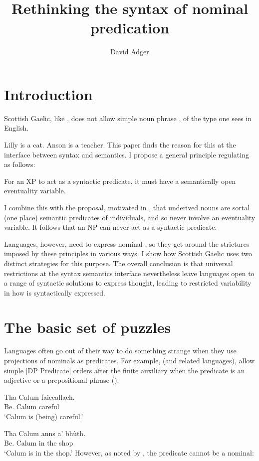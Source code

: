 \documentclass[output=paper]{langsci/langscibook}
\author{David Adger\affiliation{Queen Mary University of London}}
\title{Rethinking the syntax of nominal predication}
\begin{document}
\glsresetall

\section{Introduction}

Scottish Gaelic, like , does not allow simple noun phrase , of
the type one sees in English.

\ea
\ea Lilly is a cat.
\ex Anson is a teacher.
\z
\z
This paper finds the reason for this at the interface between syntax and
semantics. I propose a general principle regulating  as follows:

\ea For an XP to act as a syntactic predicate, it must have a semantically open
eventuality variable.
\z

I combine this with the proposal, motivated in \textcite{adgerbook}, that
underived nouns are sortal (one place) semantic predicates of individuals, and
so never involve an eventuality variable. It follows that an NP can never act
as a syntactic predicate.

Languages, however, need to express nominal , so they get around the
strictures imposed by these principles in various ways. I show how Scottish
Gaelic uses two distinct strategies for this purpose.  The overall conclusion
is that universal restrictions at the syntax semantics interface nevertheless
leave languages open to a range of syntactic solutions to express thought,
leading to restricted variability in how  is syntactically
expressed.

\section{The basic set of puzzles}

Languages often go out of their way to do something strange when they use
projections of nominals as predicates. For example,  (and
related  languages), allow simple [DP Predicate] orders after the finite
auxiliary when the predicate is an adjective or a prepositional phrase
(\citealt{chung-mccloskey:87}):

\ea {}
\sn
\gll Tha  Calum  faiceallach.\\
Be.\Prs{}  Calum  careful\\
\glt \enquote*{Calum is (being) careful.}
\z

\ea {}
\sn
\gll Tha  Calum  anns a' bh\`uth.\\
Be.\Prs{}  Calum  in the shop \\
\glt \enquote*{Calum is in the shop.}
\z
However, as noted by \citet{adger-ramchand:03}, the predicate cannot be a
nominal:
\end{document}
